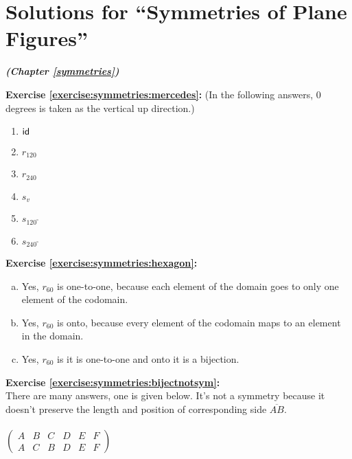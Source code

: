 \section{Solutions for  ``Symmetries of Plane Figures''}
\noindent\textbf{\textit{ (Chapter \ref{symmetries})}}\bigskip

\noindent\textbf{Exercise \ref{exercise:symmetries:mercedes}:}
(In the following answers, 0 degrees is taken as the vertical up direction.)
\begin{multicols}{3}
\begin{enumerate}
\item
$\sf{id}$

\item
$r_{120}$

\item
$r_{240}$

\item
$s_v$

\item
$s_{120^{\circ}}$

\item
$s_{240^{\circ}}$
\end{enumerate}
\end{multicols}

\noindent\textbf{Exercise \ref{exercise:symmetries:hexagon}:}
\begin{enumerate}[(a)]
\item
Yes, $r_{60}$ is one-to-one, because each element of the domain goes to only one element of the codomain.

\item
Yes, $r_{60}$ is onto, because every element of the codomain maps to an element in the domain.

\item
Yes, $r_{60}$ is it is one-to-one and onto it is a bijection.
\end{enumerate}

\noindent\textbf{Exercise \ref{exercise:symmetries:bijectnotsym}:}\\
There are many answers, one is given below.  It's not a symmetry because it doesn't preserve the length and position of corresponding side $\overline{AB}$.\\
\\
$\begin{pmatrix}
A & B & C & D & E & F\\
A & C & B & D & E & F
\end{pmatrix}$\\

